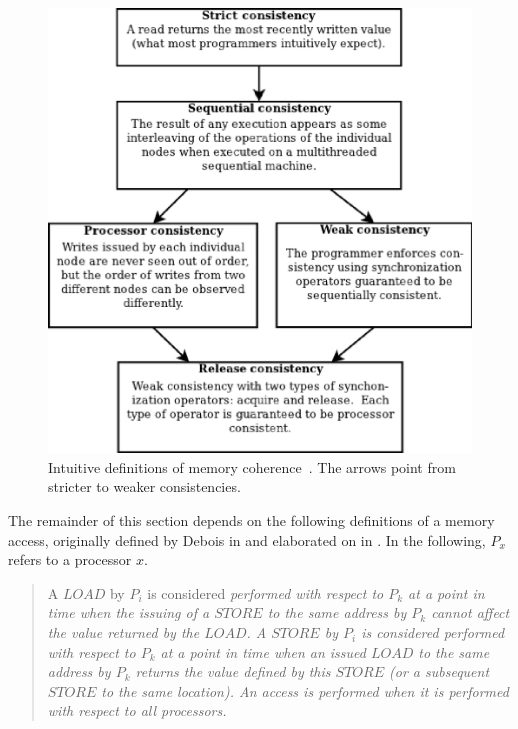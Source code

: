 \begin{figure}[!h]
\centering
\includegraphics[scale=0.40]{images/memory_consistency.eps}
\caption{Intuitive definitions of memory coherence~\cite{Nitzberg:1991:DSM:112827.112855}.  The arrows point from stricter to weaker consistencies.}
\end{figure}

The remainder of this section depends on the following definitions of a memory access, originally defined by Debois in \cite{Scheurich:1987:CMO:30350.30377, Dubois:1986:MAB:17356.17406} and elaborated on in \cite{Gharachorloo:1990:MCE:325164.325102}.  In the following, $P_x$ refers to a processor $x$.

\begin{quote}
\begin{definition}
A $LOAD$ by $P_i$ is considered \em performed with respect to \em $P_k$ at a point in time when the issuing of a $STORE$ to the same address by $P_k$ cannot affect the value returned by the $LOAD$.  A $STORE$ by $P_i$ is considered \em performed with respect to \em $P_k$ at a point in time when an issued $LOAD$ to the same address by $P_k$ returns the value defined by this $STORE$ (or a subsequent $STORE$ to the same location).  An access is \em performed \em when it is performed with respect to all processors.
\end{definition}
\end{quote}
\hfill \\

